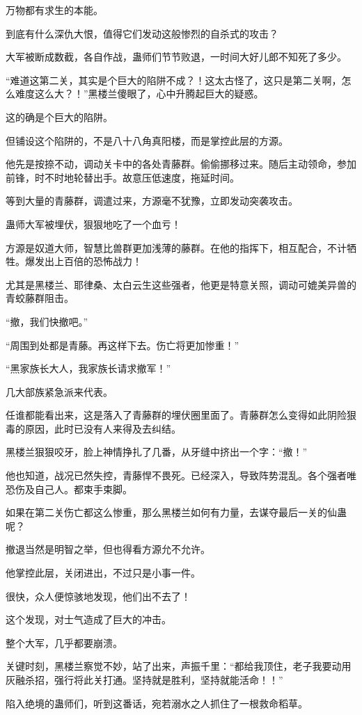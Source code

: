 \begin{this_body}
万物都有求生的本能。

到底有什么深仇大恨，值得它们发动这般惨烈的自杀式的攻击？

大军被断成数截，各自作战，蛊师们节节败退，一时间大好儿郎不知死了多少。

“难道这第二关，其实是个巨大的陷阱不成？！这太古怪了，这只是第二关啊，怎么难度这么大？！”黑楼兰傻眼了，心中升腾起巨大的疑惑。

这的确是个巨大的陷阱。

但铺设这个陷阱的，不是八十八角真阳楼，而是掌控此层的方源。

他先是按捺不动，调动关卡中的各处青藤群。偷偷挪移过来。随后主动领命，参加前锋，时不时地轮替出手。故意压低速度，拖延时间。

等到大量的青藤群，调遣过来，方源毫不犹豫，立即发动突袭攻击。

蛊师大军被埋伏，狠狠地吃了一个血亏！

方源是奴道大师，智慧比兽群更加浅薄的藤群。在他的指挥下，相互配合，不计牺牲。爆发出上百倍的恐怖战力！

尤其是黑楼兰、耶律桑、太白云生这些强者，他更是特意关照，调动可媲美异兽的青蛟藤群阻击。

“撤，我们快撤吧。”

“周围到处都是青藤。再这样下去。伤亡将更加惨重！”

“黑家族长大人，我家族长请求撤军！”

几大部族紧急派来代表。

任谁都能看出来，这是落入了青藤群的埋伏圈里面了。青藤群怎么变得如此阴险狠毒的原因，此时已没有人来得及去纠结。

黑楼兰狠狠咬牙，脸上神情挣扎了几番，从牙缝中挤出一个字：“撤！”

他也知道，战况已然失控，青藤悍不畏死。已经深入，导致阵势混乱。各个强者唯恐伤及自己人。都束手束脚。

如果在第二关伤亡都这么惨重，那么黑楼兰如何有力量，去谋夺最后一关的仙蛊呢？

撤退当然是明智之举，但也得看方源允不允许。

他掌控此层，关闭进出，不过只是小事一件。

很快，众人便惊骇地发现，他们出不去了！

这个发现，对士气造成了巨大的冲击。

整个大军，几乎都要崩溃。

关键时刻，黑楼兰察觉不妙，站了出来，声振千里：“都给我顶住，老子我要动用灰融杀招，强行将此关打通。坚持就是胜利，坚持就能活命！！”

陷入绝境的蛊师们，听到这番话，宛若溺水之人抓住了一根救命稻草。


\end{this_body}
